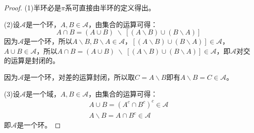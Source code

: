 \begin{proof}
	(1)半环必是$\pi$系可直接由半环的定义得出。\par
	(2)设$\mathscr{A}$是一个环，$A,B\in\mathscr{A}$，由集合的运算可得：
	\begin{equation*}
		A\cap B=(A\cup B)\;\backslash\;[(A\backslash B)\cup(B\backslash A)] 
	\end{equation*}
	因为$\mathscr{A}$是一个环，所以$A\backslash B,B\backslash A\in\mathscr{A}$，$[(A\backslash B)\cup(B\backslash A)]\in\mathscr{A}$，$A\cup B\in\mathscr{A}$，所以$A\cap B=(A\cup B)\;\backslash\;[(A\backslash B)\cup(B\backslash A)]\in\mathscr{A}$，即$\mathscr{A}$对交的运算是封闭的。\par
	因为$\mathscr{A}$是一个环，对差的运算封闭，所以取$C=A\backslash B$即有$A\backslash B=C\in\mathscr{A}$。\par
	(3)设$\mathscr{A}$是一个域，$A,B\in\mathscr{A}$，由集合的运算可得：
	\begin{gather*}
		A\cup B=(A^c\cap B^c)^c\in\mathscr{A} \\
		A\backslash B=A\cap B^c\in\mathscr{A}
	\end{gather*}
	即$\mathscr{A}$是一个环。
\end{proof}
